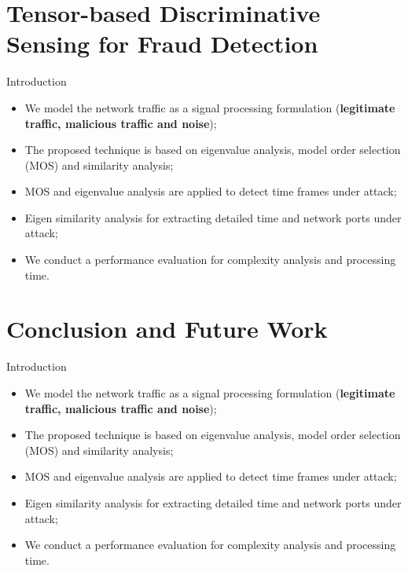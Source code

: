 \documentclass[newPxFont, numfooter, sectionpages]{beamer}
\begin{document}
\section{Tensor-based Discriminative Sensing for Fraud Detection}
\begin{frame}[c]{Introduction}
	\begin{itemize}
		\item We model the network traffic as a signal processing formulation (\textbf{legitimate traffic, malicious traffic and noise});
		\item The proposed technique is based on eigenvalue analysis, model order selection (MOS) and similarity analysis;
		\item MOS and eigenvalue analysis are applied to detect time frames under attack;
		\item Eigen similarity analysis for extracting detailed time and network ports under attack;
		\item We conduct a performance evaluation for complexity analysis and processing time.
	\end{itemize}
\end{frame}


%
%
\section{Conclusion and Future Work}
\begin{frame}[c]{Introduction}
	\begin{itemize}
		\item We model the network traffic as a signal processing formulation (\textbf{legitimate traffic, malicious traffic and noise});
		\item The proposed technique is based on eigenvalue analysis, model order selection (MOS) and similarity analysis;
		\item MOS and eigenvalue analysis are applied to detect time frames under attack;
		\item Eigen similarity analysis for extracting detailed time and network ports under attack;
		\item We conduct a performance evaluation for complexity analysis and processing time.
	\end{itemize}
\end{frame}
\end{document}
